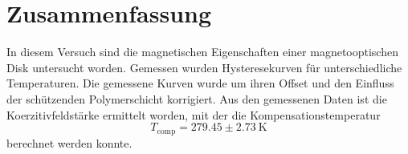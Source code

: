 \section{Zusammenfassung}
In diesem Versuch sind die magnetischen Eigenschaften einer magnetooptischen Disk untersucht worden. Gemessen wurden Hysteresekurven für unterschiedliche Temperaturen. Die gemessene Kurven wurde um ihren Offset und den Einfluss der schützenden Polymerschicht korrigiert. Aus den gemessenen Daten ist die Koerzitivfeldstärke ermittelt worden, mit der die Kompensationstemperatur 
\begin{equation}
T_\mathrm{comp}  = 279.45 \pm 2.73\ \mathrm{K} 
\end{equation}
berechnet werden konnte. 
